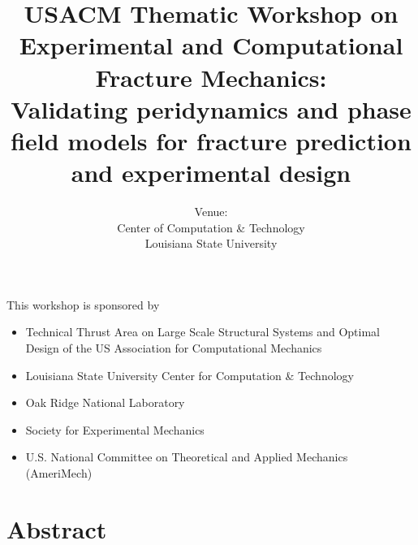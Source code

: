 \documentclass[12pt,letterpaper]{book}
\title{USACM Thematic Workshop on Experimental and Computational Fracture Mechanics: \\
	\large Validating peridynamics and phase field models for fracture prediction and experimental design}
\author{Venue: \\ Center of Computation \& Technology \\ Louisiana State University}
\begin{document}
\frontmatter

\maketitle

This workshop is sponsored by

\begin{itemize}
\item Technical Thrust Area on Large Scale Structural Systems and Optimal Design of the US Association for Computational Mechanics
\item Louisiana State University Center for Computation \& Technology 
\item Oak Ridge National Laboratory
\item Society for Experimental Mechanics
\item U.S. National Committee on Theoretical and Applied Mechanics (AmeriMech)
\end{itemize}

\newpage

\section*{Abstract}

\end{document}
